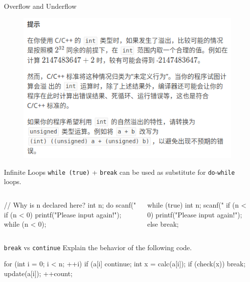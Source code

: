 \documentclass{beamer}
\newcommand{\ttt}[1]{\texttt{#1}}
\begin{document}
\begin{frame}{Overflow and Underflow}
    \begin{figure}[h]
        \centering
        \includegraphics[scale = 0.5]{figures/from-luogu.png}
    \end{figure}
\end{frame}

\begin{frame}[fragile]{Infinite Loops}
    \ttt{while (true)} + \ttt{break} can be used as substitute for \ttt{do}-\ttt{while} loops.
    \begin{columns}
        \begin{cpp}
// Why is n declared here?
int n;
do {
  scanf("%
  if (n < 0)
    printf("Please input again!\n");
} while (n < 0);
        \end{cpp}
        \begin{cpp}
while (true) {
  int n;
  scanf("%
  if (n < 0)
    printf("Please input again!\n");
  else
    break;
}
        \end{cpp}
    \end{columns}
\end{frame}

\begin{frame}[fragile]{\ttt{break} vs \ttt{continue}}
    Explain the behavior of the following code.
    \begin{cpp}
for (int i = 0; i < n; ++i) {
  if (a[i] %
    continue;
  int x = calc(a[i]);
  if (check(x))
    break;
  update(a[i]);
  ++count;
}
    \end{cpp}
\end{frame}
\end{document}
